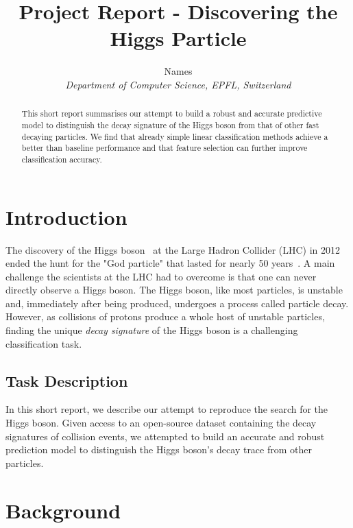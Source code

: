 \documentclass[10pt,conference,compsocconf]{IEEEtran}
\begin{document}
\title{Project Report - Discovering the Higgs Particle}

\author{
  Names\\
  \textit{Department of Computer Science, EPFL, Switzerland}
}

\maketitle

\begin{abstract}
This short report summarises our attempt to build a robust and accurate predictive model to distinguish the decay signature of the Higgs boson from that of other fast decaying particles. We find that already simple linear classification methods achieve a better than baseline performance and that feature selection can further improve classification accuracy.
\end{abstract}


\section{Introduction}

The discovery of the Higgs boson~\cite{Higgs1964} at the Large Hadron Collider (LHC) in 2012~\cite{Aad2012} ended the hunt for the "God particle" that lasted for nearly 50 years~\cite{CERN}. A main challenge the scientists at the LHC had to overcome is that one can never directly observe a Higgs boson. The Higgs boson, like most particles, is unstable and, immediately after being produced, undergoes a process called particle decay. However, as collisions of protons produce a whole host of unstable particles, finding the unique \emph{decay signature} of the Higgs boson is a challenging classification task.

\subsection{Task Description}
In this short report, we describe our attempt to reproduce the search for the Higgs boson. Given access to an open-source dataset containing the decay signatures of collision events, we attempted to build an accurate and robust prediction model to distinguish the Higgs boson's decay trace from other particles.

\section{Background}
\end{document}
